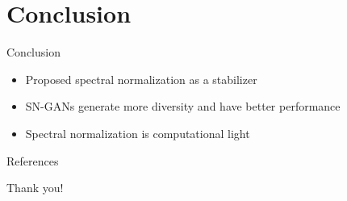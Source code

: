\documentclass[xcolor={svgnames}]{beamer}
\begin{document}
\section{Conclusion}
\begin{frame}{Conclusion}
  \begin{itemize}
    \item Proposed spectral normalization as a stabilizer
    \item SN-GANs generate more diversity and have better performance
    \item Spectral normalization is computational light
  \end{itemize}
\end{frame}
\begin{frame}{References}
    
    
\end{frame}
\begin{frame}[standout]
    \Huge Thank you!
\end{frame}

\end{document}
